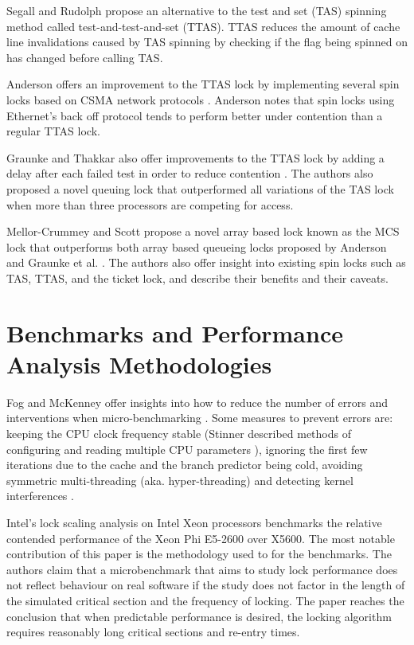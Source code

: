 Segall and Rudolph \cite{rudolph1984dynamic} propose an alternative to the test and set (TAS) spinning method called test-and-test-and-set (TTAS). TTAS reduces the amount of cache line invalidations caused by TAS spinning by checking if the flag being spinned on has changed before calling TAS.

Anderson offers an improvement to the TTAS lock by implementing several spin locks based on CSMA network protocols \cite{anderson1990performance}. Anderson notes that spin locks using Ethernet's back off protocol tends to perform better under contention than a regular TTAS lock.

Graunke and Thakkar also offer improvements to the TTAS lock by adding a delay after each failed test in order to reduce contention \cite{graunke1990synchronization}. The authors also proposed a novel queuing lock that outperformed all variations of the TAS lock when more than three processors are competing for access.

Mellor-Crummey and Scott propose a novel array based lock known as the MCS lock that outperforms both array based queueing locks proposed by Anderson and Graunke et al. \cite{mellor1991algorithms}. The authors also offer insight into existing spin locks such as TAS, TTAS, and the ticket lock, and describe their benefits and their caveats.

\section{Benchmarks and Performance Analysis Methodologies}
Fog and McKenney offer insights into how to reduce the number of errors and interventions when micro-benchmarking \cite{fog1996optimizing,fog2020optimizing, perfbook2021}. Some measures to prevent errors are: keeping the CPU clock frequency stable (Stinner described methods of configuring and reading multiple CPU parameters \cite{stinnerpstate}), ignoring the first few iterations due to the cache and the branch predictor being cold\cite{fog1996optimizing}, avoiding symmetric multi-threading (aka. hyper-threading) \cite{fog2020optimizing} and detecting kernel interferences \cite[Chapter~11.7]{perfbook2021}.

Intel's lock scaling analysis on Intel Xeon processors \cite{intelxeonlockscaling} benchmarks the relative contended performance of the Xeon Phi E5-2600 over X5600. The most notable contribution of this paper is the methodology used to for the benchmarks. The authors claim that a microbenchmark that aims to study lock performance does not reflect behaviour on real software if the study does not factor in the length of the simulated critical section and the frequency of locking. The paper reaches the conclusion that when predictable performance is desired, the locking algorithm requires reasonably long critical sections and re-entry times.


